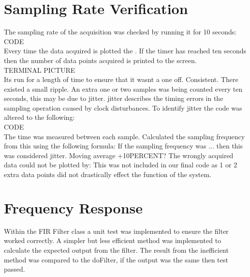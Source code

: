 \documentclass{article}
\begin{document}
\section{Sampling Rate Verification}
The sampling rate of the acquisition was checked by running it for 10 seconds:\\
CODE\\
Every time the data acquired is plotted the . If the timer has reached ten seconds then the number of data points acquired is printed to the screen.\\
TERMINAL PICTURE\\
Its run for a length of time to ensure that it wasnt a one off. Consistent. There existed a small ripple. An extra one or two samples was being counted every ten seconds, this may be due to jitter. jitter describes the timing errors in the sampling operation caused by clock disturbances. To identify jitter the code was altered to the following:\\
CODE\\
The time was measured between each sample. Calculated the sampling frequency from this using the following formula: If the sampling frequency was ... then this was considered jitter. Moving average +10PERCENT? The wrongly acquired data could not be plotted by:
This was not included in our final code as 1 or 2 extra data points did not drastically effect the function of the system.
\section{Frequency Response}

Within the FIR Filter class a unit test was implemented to ensure the filter worked correctly. A simpler but less efficient method was implemented to calculate the expected output from the filter. The result from the inefficient method was compared to the doFilter, if the output was the same then test passed.
\end{document}

